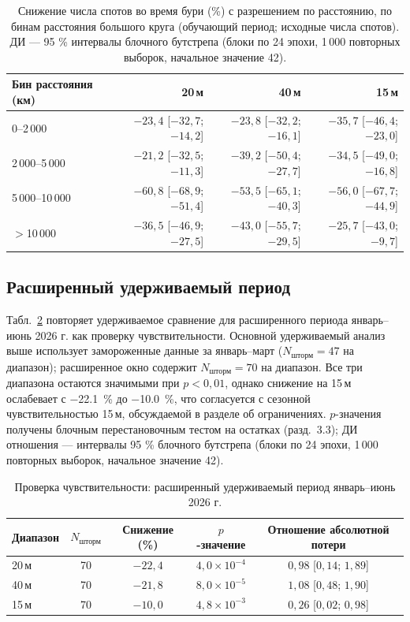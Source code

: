 \documentclass{agujournal2019}
\begin{document}
\begin{table}[h]
	\centering
	\small
	\caption{Снижение числа спотов во время бури (\%) с разрешением
		по расстоянию, по бинам расстояния большого круга (обучающий
		период; исходные числа спотов). ДИ — 95 \% интервалы блочного бутстрепа (блоки по 24 эпохи,
		1\,000 повторных выборок, начальное значение 42).}
	\label{tab:distance}
	\begin{tabular}{lrrr}
		\toprule
		Бин расстояния (км) & 20\,м & 40\,м & 15\,м \\
		\midrule
		0--2\,000     & $-23{,}4$ [$-32{,}7$; $-14{,}2$]
		& $-23{,}8$ [$-32{,}2$; $-16{,}1$]
		& $-35{,}7$ [$-46{,}4$; $-23{,}0$] \\
		2\,000--5\,000 & $-21{,}2$ [$-32{,}5$; $-11{,}3$]
		& $-39{,}2$ [$-50{,}4$; $-27{,}7$]
		& $-34{,}5$ [$-49{,}0$; $-16{,}8$] \\
		5\,000--10\,000 & $-60{,}8$ [$-68{,}9$; $-51{,}4$]
		& $-53{,}5$ [$-65{,}1$; $-40{,}3$]
		& $-56{,}0$ [$-67{,}7$; $-44{,}9$] \\
		$>$10\,000    & $-36{,}5$ [$-46{,}9$; $-27{,}5$]
		& $-43{,}0$ [$-55{,}7$; $-29{,}5$]
		& $-25{,}7$ [$-43{,}0$; $-9{,}7$] \\
		\bottomrule
	\end{tabular}
\end{table}

\subsection{Расширенный удерживаемый период}

Табл.~\ref{tab:heldout_sensitivity} повторяет удерживаемое сравнение для
расширенного периода январь--июнь 2026 г. как проверку чувствительности.
Основной удерживаемый анализ выше использует замороженные данные за
январь--март ($N_{\mbox{шторм}} = 47$ на диапазон); расширенное окно
содержит $N_{\mbox{шторм}} = 70$ на диапазон. Все три диапазона остаются
значимыми при $p < 0{,}01$, однако снижение на 15\,м ослабевает с
\SI{-22.1}{\percent} до \SI{-10.0}{\percent}, что согласуется с
сезонной чувствительностью 15\,м, обсуждаемой в разделе об ограничениях.
$p$-значения получены блочным перестановочным тестом на остатках
(разд.~3.3); ДИ отношения — интервалы 95 \% блочного бутстрепа
(блоки по 24 эпохи, 1\,000 повторных выборок, начальное значение 42).

\begin{table}[h]
	\centering
	\small
	\caption{Проверка чувствительности: расширенный удерживаемый период
		январь--июнь 2026 г.}
	\label{tab:heldout_sensitivity}
	\begin{tabular}{lcccc}
		\toprule
		Диапазон & $N_{\mbox{шторм}}$ & Снижение (\%) & $p$-значение
		& Отношение абсолютной потери \\
		\midrule
		20\,м & 70 & $-22{,}4$ & $4{,}0 \times 10^{-4}$ & $0{,}98$ [$0{,}14$; $1{,}89$] \\
		40\,м & 70 & $-21{,}8$ & $8{,}0 \times 10^{-5}$ & $1{,}08$ [$0{,}48$; $1{,}90$] \\
		15\,м & 70 & $-10{,}0$ & $4{,}8 \times 10^{-3}$ & $0{,}26$ [$0{,}02$; $0{,}98$] \\
		\bottomrule
	\end{tabular}
\end{table}
\end{document}
